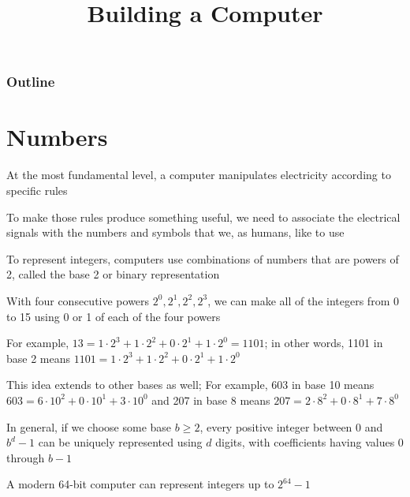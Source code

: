 \documentclass[8pt,a4paper,compress]{beamer}
\title{Building a Computer}
\date{}
\begin{document}
\begin{frame}
\vfill
\titlepage
\end{frame}

\begin{frame}
\frametitle{Outline}
\tableofcontents
\end{frame}

\section{Numbers}
\begin{frame}[fragile]
\pause

At the most fundamental level, a computer manipulates electricity according to specific rules

\pause
\bigskip

To make those rules produce something useful, we need to associate the electrical signals with the numbers and symbols that we, as humans, like to use

\pause
\bigskip

To represent integers, computers use combinations of numbers that are powers of 2, called the base 2 or binary representation

\pause
\bigskip

With four consecutive powers $2^0, 2^1, 2^2, 2^3$, we can make all of the integers from 0 to 15 using 0 or 1 of each of the four powers

\pause
\bigskip

For example, $13 = 1 \cdot 2^3 + 1 \cdot 2^2 + 0 \cdot 2^1 + 1 \cdot 2^0 = 1101$; in other words, 1101 in base 2 means $1101 = 1 \cdot 2^3 + 1 \cdot 2^2 + 0 \cdot 2^1 + 1 \cdot 2^0$

\pause
\bigskip

This idea extends to other bases as well; For example, 603 in base 10 means $603 = 6 \cdot 10^2 + 0 \cdot 10^1 + 3 \cdot 10^0$ and 207 in base 8 means $207 = 2 \cdot 8^2 + 0 \cdot 8^1 + 7 \cdot 8^0$

\pause
\bigskip

In general, if we choose some base $b \geq 2$, every positive integer between 0 and $b^d-1$ can be uniquely represented using $d$ digits, with coefficients having values 0 through $b-1$

\pause
\bigskip

A modern 64-bit computer can represent integers up to $2^{64} - 1$
\end{frame}
\end{document}
